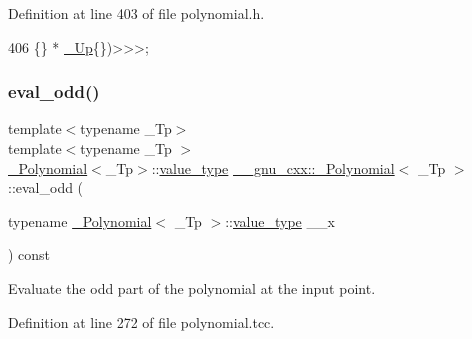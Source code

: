 Definition at line 403 of file polynomial.\+h.


\begin{DoxyCode}
406                                                             \{\} * \hyperlink{class____gnu__cxx_1_1__Polynomial_a242114d4b86648a5dff67a8221f80d40}{\_Up}\{\})>>>;
\end{DoxyCode}
\mbox{\label{class____gnu__cxx_1_1__Polynomial_acd4fd2288b7dd7a5933e84ae372d4769}} 
\subsubsection{\texorpdfstring{eval\+\_\+odd()}{eval\_odd()}\hspace{0.1cm}{\footnotesize\ttfamily [1/3]}}
{\footnotesize\ttfamily template$<$typename \+\_\+\+Tp$>$ \\
template$<$typename \+\_\+\+Tp $>$ \\
\hyperlink{class____gnu__cxx_1_1__Polynomial}{\+\_\+\+Polynomial}$<$\+\_\+\+Tp$>$\+::\hyperlink{class____gnu__cxx_1_1__Polynomial_a725563351f50e76084a7a016c06f8a53}{value\+\_\+type} \hyperlink{class____gnu__cxx_1_1__Polynomial}{\+\_\+\+\_\+gnu\+\_\+cxx\+::\+\_\+\+Polynomial}$<$ \+\_\+\+Tp $>$\+::eval\+\_\+odd (\begin{DoxyParamCaption}\item[{typename \hyperlink{class____gnu__cxx_1_1__Polynomial}{\+\_\+\+Polynomial}$<$ \+\_\+\+Tp $>$\+::\hyperlink{class____gnu__cxx_1_1__Polynomial_a725563351f50e76084a7a016c06f8a53}{value\+\_\+type}}]{\+\_\+\+\_\+x }\end{DoxyParamCaption}) const}

Evaluate the odd part of the polynomial at the input point. 

Definition at line 272 of file polynomial.\+tcc.


